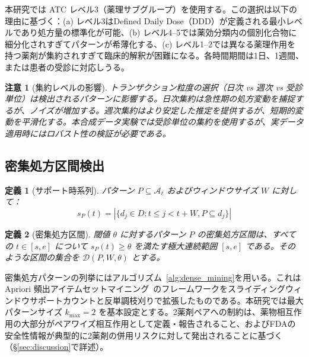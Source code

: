 \documentclass[11pt]{article}
\newtheorem{definition}{定義}
\newtheorem{remark}{注意}
\begin{document}
本研究では ATC レベル3（薬理サブグループ）を使用する。この選択は以下の理由に基づく：(a) レベル3はDefined Daily Dose（DDD）が定義される最小レベルであり処方量の標準化が可能、(b) レベル4--5では薬効分類内の個別化合物に細分化されすぎてパターンが希薄化する、(c) レベル1--2では異なる薬理作用を持つ薬剤が集約されすぎて臨床的解釈が困難になる。各時間期間は1日、1週間、または患者の受診に対応しうる。

\begin{remark}[集約レベルの影響]
トランザクション粒度の選択（日次 vs 週次 vs 受診単位）は検出されるパターンに影響する。日次集約は急性期の処方変動を捕捉するが、ノイズが増加する。週次集約はより安定した推定を提供するが、短期的変動を平滑化する。本合成データ実験では受診単位の集約を使用するが、実データ適用時にはロバスト性の検証が必要である。
\end{remark}

\subsection{密集処方区間検出}

\begin{definition}[サポート時系列]
パターン $P \subseteq \mathcal{A}_\ell$ およびウィンドウサイズ $W$ に対して：
\begin{equation}
s_P(t) = |\{d_j \in D : t \leq j < t + W, P \subseteq d_j\}|
\label{eq:support}
\end{equation}
\end{definition}

\begin{definition}[密集処方区間]
閾値 $\theta$ に対するパターン $P$ の\emph{密集処方区間}は、すべての $t \in [s, e]$ について $s_P(t) \geq \theta$ を満たす極大連続範囲 $[s, e]$ である。そのような区間の集合を $\mathcal{D}(P, W, \theta)$ とする。
\end{definition}

密集処方パターンの列挙にはアルゴリズム~\ref{alg:dense_mining}を用いる。これは Apriori 頻出アイテムセットマイニング~\citep{agrawal1994apriori}のフレームワークをスライディングウィンドウサポートカウントと反単調枝刈りで拡張したものである。本研究では最大パターンサイズ $k_{\max} = 2$ を基本設定とする。2薬剤ペアへの制約は、薬物相互作用の大部分がペアワイズ相互作用として定義・報告されること、およびFDAの安全性情報が典型的に2薬剤の併用リスクに対して発出されることに基づく（\S\ref{sec:discussion}で詳述）。
\end{document}
